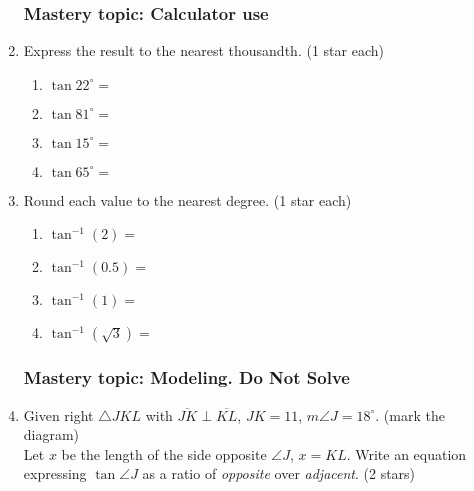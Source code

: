 \documentclass[12pt, twoside]{article}
\begin{document}
\begin{enumerate}
\subsubsection*{Mastery topic: Calculator use}
  \item Express the result to the nearest thousandth. \hfill (1 star each) \vspace{.5cm}
    \begin{multicols}{2}
      \begin{enumerate}
        \item $\tan 22^\circ = $ \vspace{1cm}
        \item $\tan 81^\circ =$
        \item $\tan 15^\circ = $ \vspace{1cm}
        \item $\tan 65^\circ =$
      \end{enumerate}
    \end{multicols} \vspace{1cm}

    \item Round each value to the nearest degree. \hfill (1 star each) \vspace{.5cm}
    \begin{multicols}{2}
      \begin{enumerate}
        \item $\tan^{-1} (2) = $ \vspace{1cm}
        \item $\tan^{-1} (0.5) =$
        \item $\tan^{-1} (1) = $ \vspace{1cm}
        \item $\tan^{-1} (\sqrt{3}) =$
      \end{enumerate}
    \end{multicols} \vspace{1cm}

\subsubsection*{Mastery topic: Modeling. Do Not Solve}
  \item Given right $\triangle JKL$ with $\overline{JK} \perp \overline{KL}$, $JK=11$, $m\angle J=18^\circ$. (mark the diagram)\\[0.5cm]
    Let $x$ be the length of the side opposite $\angle J$, $x=KL$. Write an equation expressing $\tan \angle J$ as a ratio of \emph{opposite} over \emph{adjacent}. \hfill (2 stars)
      \begin{flushright}
        \end{flushright}


\end{enumerate}
\end{document}
